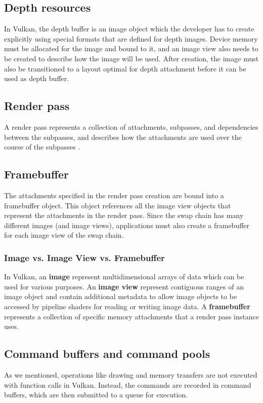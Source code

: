 \subsection{Depth resources}
In Vulkan, the depth buffer is an image object which the developer has to create explicitly using special formats that are defined for depth images. Device memory must be allocated for the image and bound to it, and an image view also needs to be created to describe how the image will be used. After creation, the image must also be transitioned to a layout optimal for depth attachment before it can be used as depth buffer.

\subsection{Render pass}
A render pass represents a collection of attachments, subpasses, and dependencies between the subpasses, and describes how the attachments are used over the course of the subpasses \cite{vulkan_docs}.

\subsection{Framebuffer}
The attachments specified in the render pass creation are bound into a framebuffer object. This object references all the image view objects that represent the attachments in the render pass. Since the swap chain has many different images (and image views), applications must also create a framebuffer for each image view of the swap chain.

\subsubsection{Image vs. Image View vs. Framebuffer}
In Vulkan, an \textbf{image} represent multidimensional arrays of data which can be used for various purposes.
An \textbf{image view} represent contiguous ranges of an image object and contain additional metadata to allow image objects to be accessed by pipeline shaders for reading or writing image data.
A \textbf{framebuffer} represents a collection of specific memory attachments that a render pass instance uses.

\subsection{Command buffers and command pools}
As we mentioned, operations like drawing and memory transfers are not executed with function calls in Vulkan. Instead, the commands are recorded in command buffers, which are then submitted to a queue for execution.

